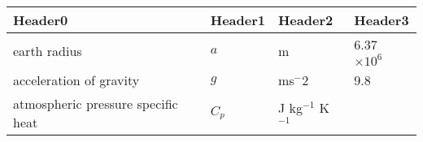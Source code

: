 \begin{longtable}[]{@{}llll@{}}
\toprule
\begin{minipage}[b]{0.22\columnwidth}\raggedright
Header0\strut
\end{minipage} & \begin{minipage}[b]{0.22\columnwidth}\raggedright
Header1\strut
\end{minipage} & \begin{minipage}[b]{0.22\columnwidth}\raggedright
Header2\strut
\end{minipage} & \begin{minipage}[b]{0.22\columnwidth}\raggedright
Header3\strut
\end{minipage}\tabularnewline
\midrule
\endhead
\begin{minipage}[t]{0.22\columnwidth}\raggedright
earth radius\strut
\end{minipage} & \begin{minipage}[t]{0.22\columnwidth}\raggedright
\(a\)\strut
\end{minipage} & \begin{minipage}[t]{0.22\columnwidth}\raggedright
m\strut
\end{minipage} & \begin{minipage}[t]{0.22\columnwidth}\raggedright
6.37 \(\times 10^6\)\strut
\end{minipage}\tabularnewline
\begin{minipage}[t]{0.22\columnwidth}\raggedright
acceleration of gravity\strut
\end{minipage} & \begin{minipage}[t]{0.22\columnwidth}\raggedright
\(g\)\strut
\end{minipage} & \begin{minipage}[t]{0.22\columnwidth}\raggedright
ms\(^-2\)\strut
\end{minipage} & \begin{minipage}[t]{0.22\columnwidth}\raggedright
9.8\strut
\end{minipage}\tabularnewline
\begin{minipage}[t]{0.22\columnwidth}\raggedright
atmospheric pressure specific heat\strut
\end{minipage} & \begin{minipage}[t]{0.22\columnwidth}\raggedright
\(C_p\)\strut
\end{minipage} & \begin{minipage}[t]{0.22\columnwidth}\raggedright
J kg\(^{-1}\) K\(^{-1}\)\strut
\end{minipage} & \begin{minipage}[t]{0.22\columnwidth}\raggedright

\end{minipage}
\end{longtable}
